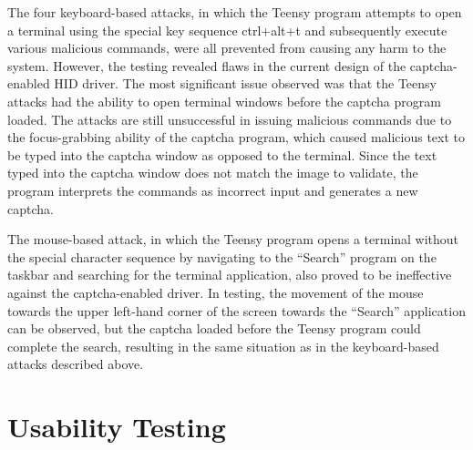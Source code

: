 \documentclass[pagenumbers]{ieee}
\begin{document}
\begin{itemize}
The four keyboard-based attacks, in which the Teensy program attempts to open a terminal using the special key sequence ctrl+alt+t and subsequently execute various malicious commands, were all prevented from causing any harm to the system. However, the testing revealed flaws in the current design of the captcha-enabled HID driver. The most significant issue observed was that the Teensy attacks had the ability to open terminal windows before the captcha program loaded. The attacks are still unsuccessful in issuing malicious commands due to the focus-grabbing ability of the captcha program, which caused malicious text to be typed into the captcha window as opposed to the terminal. Since the text typed into the captcha window does not match the image to validate, the program interprets the commands as incorrect input and generates a new captcha.

The mouse-based attack, in which the Teensy program opens a terminal without the special character sequence by navigating to the ``Search'' program on the taskbar and searching for the terminal application, also proved to be ineffective against the captcha-enabled driver. In testing, the movement of the mouse towards the upper left-hand corner of the screen towards the ``Search'' application can be observed, but the captcha loaded before the Teensy program could complete the search, resulting in the same situation as in the keyboard-based attacks described above.

\end{itemize}


\section{Usability Testing}
\label{section:usability}
\end{document}
